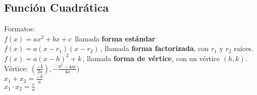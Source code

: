 \subsection{Función Cuadrática}
Formatos:\\
$f(x) = a x^2 + b x + c \,\!$ llamada \textbf{forma estándar}\\
$f(x) = a(x - r_1)(x - r_2)\,\!$, llamada \textbf{forma factorizada}, con $r_1$ y $r_2$ raíces.\\
$f(x) = a(x - h)^2 + k \,\!$, llamada \textbf{forma de vértice}, con un vértice $(h, k)$.\\

Vértice: $(\frac{-b}{2a}),-\frac{b^2-4ac}{4a})$\\
$x_1 + x_2 = \frac{-b}{a}$\\
$x_1 \cdot x_2 = \frac{c}{a}$\\